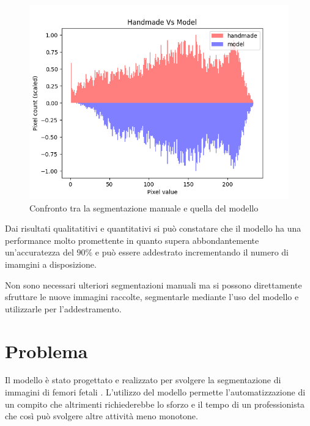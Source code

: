 \begin{figure}[!ht]
	\begin{adjustbox}{width=0.65\columnwidth, center}
    \includegraphics{./images/handmade_vs_model_scaled.png}
  \end{adjustbox}
  \caption{Confronto tra la segmentazione manuale e quella del modello}
  \label{fig:confronto tra la segmentazione manuale e quella del modello}
\end{figure}

Dai risultati qualitatitivi e quantitativi si pu\`o constatare che il modello ha una performance
molto promettente in quanto supera abbondantemente un'accuratezza del $90\%$ e pu\`o essere 
addestrato incrementando il numero di imamgini a disposizione. 

Non sono necessari ulteriori segmentazioni manuali ma si possono direttamente sfruttare
le nuove immagini raccolte, segmentarle mediante l'uso del modello e utilizzarle per l'addestramento.





\section{Problema} %
\label{sec:Problema}

Il modello è stato progettato e realizzato per svolgere la segmentazione di immagini di femori fetali \cite{abstract1} \cite{abstract2} .
L'utilizzo del modello permette l'automatizzazione di un compito che altrimenti richiederebbe lo sforzo e il tempo di un 
professionista che così può svolgere altre attività meno monotone.

